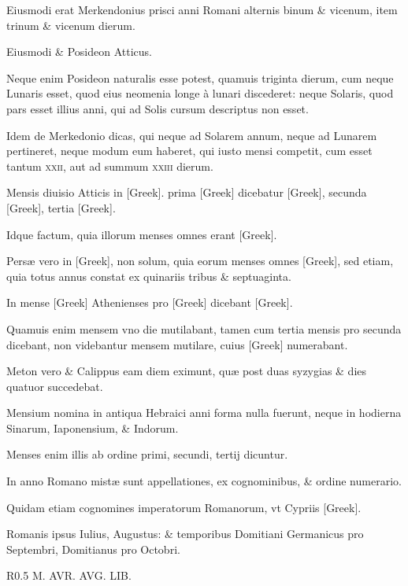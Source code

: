 \begin{parnumbers}

Eiusmodi erat Merkendonius 
prisci anni Romani alternis binum \& vicenum, item trinum \& vicenum
dierum.

Eiusmodi \& Posideon Atticus.

Neque enim Posideon
naturalis esse potest, quamuis triginta dierum, cum neque Lunaris
esset, quod eius neomenia longe à lunari discederet: neque Solaris,
quod pars esset illius anni, qui ad Solis cursum descriptus non esset.

Idem de Merkedonio dicas, qui neque ad Solarem annum, neque ad
Lunarem pertineret, neque modum eum haberet, qui iusto mensi
competit, cum esset tantum \textsc{xxii}, aut ad summum \textsc{xxiii} dierum.

Mensis diuisio Atticis in \textgreek{[Greek]}.
 prima \textgreek{[Greek]} dicebatur \textgreek{[Greek]},
secunda \textgreek{[Greek]}, tertia \textgreek{[Greek]}.

Idque factum, quia
illorum menses omnes erant \textgreek{[Greek]}.

Persæ vero in \textgreek{[Greek]},
non solum, quia eorum menses omnes \textgreek{[Greek]}, sed etiam, quia
totus annus constat ex quinariis tribus \& septuaginta.

In mense \textgreek{[Greek]}
Athenienses pro \textgreek{[Greek]} dicebant \textgreek{[Greek]}.

Quamuis
enim mensem vno die mutilabant, tamen cum tertia mensis
pro secunda dicebant, non videbantur mensem mutilare, cuius
\textgreek{[Greek]} numerabant.

Meton vero \& Calippus eam diem eximunt,
quæ post duas syzygias \& dies quatuor succedebat.

Mensium nomina
in antiqua Hebraici anni forma nulla fuerunt, neque in hodierna
Sinarum, Iaponensium, \& Indorum.

Menses enim illis ab ordine
primi, secundi, tertij dicuntur.

In anno Romano mistæ sunt appellationes,
ex cognominibus, \& ordine numerario.

Quidam etiam cognomines
imperatorum Romanorum, vt Cypriis \textgreek{[Greek]}.

Romanis ipsus Iulius, Augustus: \& temporibus Domitiani
Germanicus pro Septembri, Domitianus pro Octobri.

\begin{wrapfigure}[16]{R}{0.5\textwidth}
  \centering
  {M. AVR. AVG. LIB.}
\end{wrapfigure}


\end{parnumbers}

